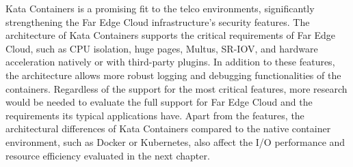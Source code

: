 Kata Containers is a promising fit to the telco environments, significantly strengthening the Far Edge Cloud infrastructure's security features. The architecture of Kata Containers supports the critical requirements of Far Edge Cloud, such as CPU isolation, huge pages, Multus, SR-IOV, and hardware acceleration natively or with third-party plugins. In addition to these features, the architecture allows more robust logging and debugging functionalities of the containers. Regardless of the support for the most critical features, more research would be needed to evaluate the full support for Far Edge Cloud and the requirements its typical applications have. Apart from the features, the architectural differences of Kata Containers compared to the native container environment, such as Docker or Kubernetes, also affect the I/O performance and resource efficiency evaluated in the next chapter.
